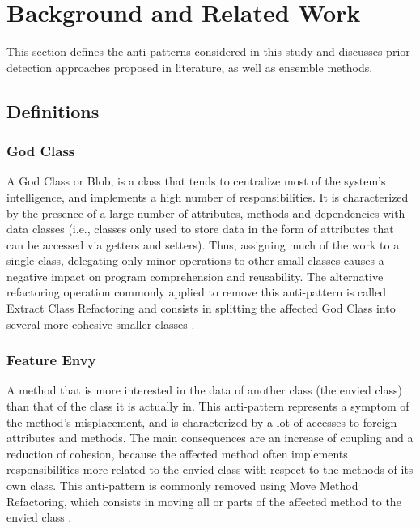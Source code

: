 \section{Background and Related Work}
\label{section: related work}
This section defines the anti-patterns considered in this study and discusses prior detection approaches proposed in literature, as well as ensemble methods.
\subsection{Definitions}
\subsubsection{God Class}
A God Class or Blob, is a class that tends to centralize most of the system's intelligence, and implements a high number of responsibilities.
It is characterized by the presence of a large number of attributes, methods and dependencies with data classes (i.e., classes only used to store data in the form of attributes that can be accessed via getters and setters). Thus, assigning much of the work to a single class, delegating only minor operations to other small classes causes a negative impact on program comprehension \cite{abbes2011empirical} and reusability. The alternative refactoring operation commonly applied to remove this anti-pattern is called Extract Class Refactoring and consists in splitting the affected God Class into several more cohesive smaller classes \cite{Fowler1999}.

\subsubsection{Feature Envy}
A method that is more interested in the data of another class (the envied class) than that of the class it is actually in. This anti-pattern represents a symptom of the method's misplacement, and is characterized by a lot of accesses to foreign attributes and methods. The main consequences are an increase of coupling and a reduction of cohesion, because the affected method often implements responsibilities more related to the envied class with respect to the methods of its own class. This anti-pattern is commonly removed using Move Method Refactoring, which consists in moving all or parts of the affected method to the envied class \cite{Fowler1999}.

